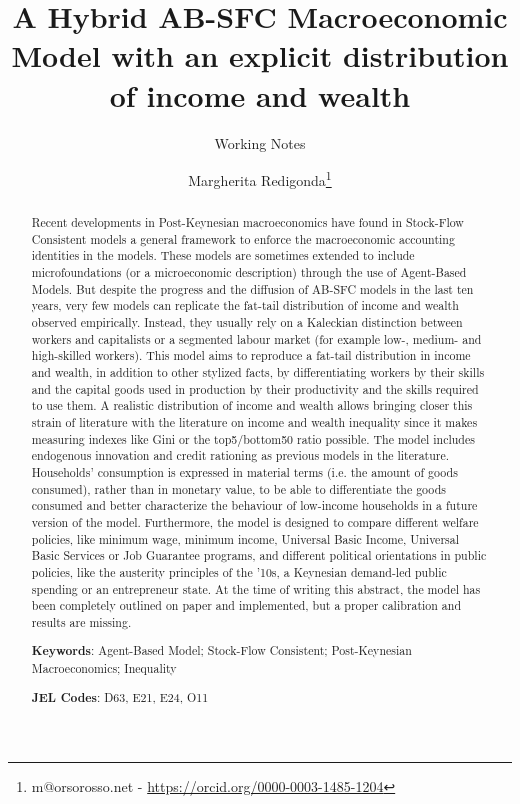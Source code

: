 \documentclass[a4paper, headings=standardclasses]{scrartcl}
\title{A Hybrid AB-SFC Macroeconomic Model with an explicit distribution of income and wealth \let\thefootnote\relax\footnotetext{
	This version is intended to be submitted as a working paper to the 2024 STOREP Conference.

	An updated version of this paper and all the source code and the instructions required to replicate the paper will be available at \url{https://github.com/TnTo/FE/}
  }}
\subtitle{Working Notes}
\author{Margherita Redigonda\thanks{m@orsorosso.net - \url{https://orcid.org/0000-0003-1485-1204}}}
\numberwithin{equation}{subsection}
\begin{document}
\maketitle

\begin{abstract}
    Recent developments in Post-Keynesian macroeconomics have found in Stock-Flow Consistent models a general framework to enforce the macroeconomic accounting identities in the models.
    These models are sometimes extended to include microfoundations (or a microeconomic description) through the use of Agent-Based Models.
    But despite the progress and the diffusion of AB-SFC models in the last ten years, very few models can replicate the fat-tail distribution of income and wealth observed empirically.
    Instead, they usually rely on a Kaleckian distinction between workers and capitalists or a segmented labour market (for example low-, medium- and high-skilled workers).
    This model aims to reproduce a fat-tail distribution in income and wealth, in addition to other stylized facts, by differentiating workers by their skills and the capital goods used in production by their productivity and the skills required to use them.
    A realistic distribution of income and wealth allows bringing closer this strain of literature with the literature on income and wealth inequality since it makes measuring indexes like Gini or the top5/bottom50 ratio possible.
    The model includes endogenous innovation and credit rationing as previous models in the literature.
    Households' consumption is expressed in material terms (i.e. the amount of goods consumed), rather than in monetary value, to be able to differentiate the goods consumed and better characterize the behaviour of low-income households in a future version of the model.%
    Furthermore, the model is designed to compare different welfare policies, like minimum wage, minimum income, Universal Basic Income, Universal Basic Services or Job Guarantee programs, and different political orientations in public policies, like the austerity principles of the '10s, a Keynesian demand-led public spending or an entrepreneur state.
    At the time of writing this abstract, the model has been completely outlined on paper and implemented, but a proper calibration and results are missing.

    \textbf{Keywords}: Agent-Based Model; Stock-Flow Consistent; Post-Keynesian Macroeconomics; Inequality

    \textbf{JEL Codes}: D63, E21, E24, O11
\end{abstract}
\end{document}
